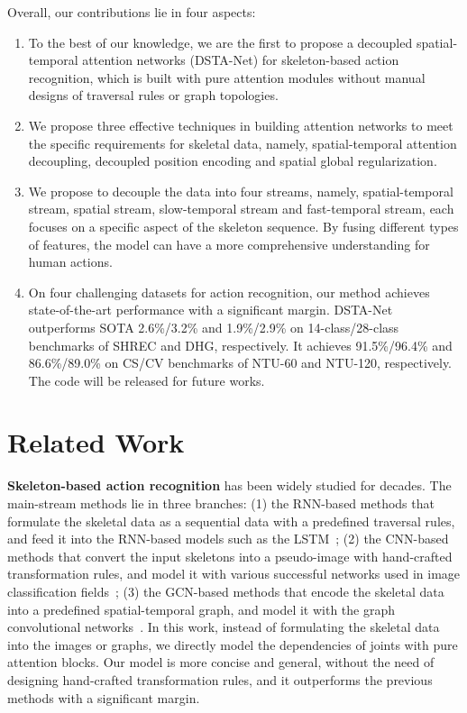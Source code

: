 \documentclass[runningheads]{llncs}
\begin{document}
Overall, our contributions lie in four aspects: 
\begin{enumerate}
    \item To the best of our knowledge, we are the first to propose a decoupled spatial-temporal attention networks (DSTA-Net) for skeleton-based action recognition, which is built with pure attention modules without manual designs of traversal rules or graph topologies. 
    \item We propose three effective techniques in building attention networks to meet the specific requirements for skeletal data, namely, spatial-temporal attention decoupling, decoupled position encoding and spatial global regularization.  
    \item We propose to decouple the data into four streams, namely, spatial-temporal stream, spatial stream, slow-temporal stream and fast-temporal stream, each focuses on a specific aspect of the skeleton sequence. By fusing different types of features, the model can have a more comprehensive understanding for human actions. 
    \item On four challenging datasets for action recognition, our method achieves state-of-the-art performance with a significant margin. 
    DSTA-Net outperforms SOTA 2.6\%/3.2\% and 1.9\%/2.9\% on 14-class/28-class benchmarks of SHREC and DHG, respectively. 
    It achieves 91.5\%/96.4\% and 86.6\%/89.0\% on CS/CV benchmarks of NTU-60 and NTU-120, respectively. 
    The code will be released for future works. 
\end{enumerate}


\section{Related Work}


\textbf{Skeleton-based action recognition} has been widely studied for decades. The main-stream methods lie in three branches: 
(1) the RNN-based methods that formulate the skeletal data as a sequential data with a predefined traversal rules, and feed it into the RNN-based models such as the  LSTM~\cite{zhang_view_2017,li_independently_2018,si_skeleton-based_2018,si_attention_2019}; 
(2) the CNN-based methods that convert the input skeletons into a pseudo-image with hand-crafted transformation rules, and model it with various successful networks used in image classification fields~\cite{li_skeleton-based_2017,liu_enhanced_2017,cao_skeleton-based_2018};
(3) the GCN-based methods that encode the skeletal data into a predefined spatial-temporal graph, and model it with the graph convolutional networks~\cite{yan_spatial_2018,tang_deep_2018,shi_two-stream_2019}.
In this work, instead of formulating the skeletal data into the images or graphs, we directly model the dependencies of joints with pure attention blocks. 
Our model is more concise and general, without the need of designing hand-crafted transformation rules, and it outperforms the previous methods with a significant margin. 
\end{document}
